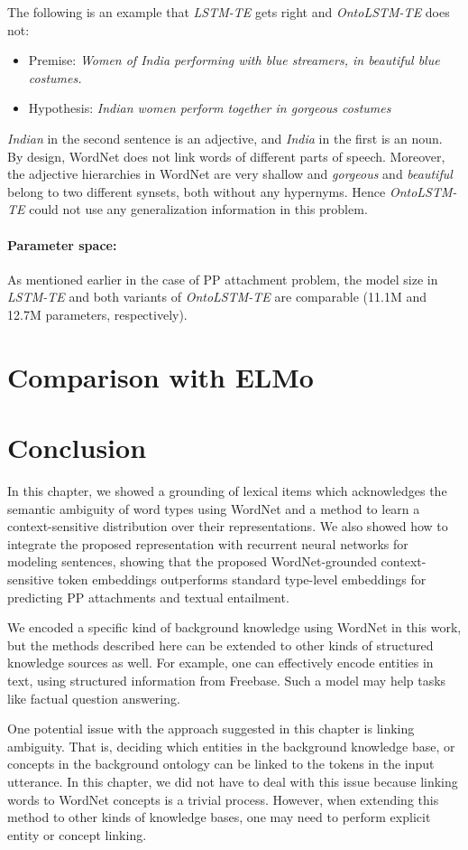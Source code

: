 The following is an example that \textit{LSTM-TE} gets right and \textit{OntoLSTM-TE} does not:
\begin{itemize}
 \item Premise: \textit{Women of India performing with blue streamers, in 
beautiful blue costumes.}
 \item Hypothesis: \textit{Indian women perform together in gorgeous costumes}
\end{itemize}
\textit{Indian} in the second sentence is an adjective, and \textit{India} in 
the first is an noun. By design, WordNet does not link words of different parts 
of speech. Moreover, the adjective hierarchies in WordNet are very shallow and 
\textit{gorgeous} and \textit{beautiful} belong to two different synsets, both 
without any hypernyms. Hence \textit{OntoLSTM-TE} could not use any generalization 
information in this problem.

\paragraph{Parameter space:} As mentioned earlier in the case of PP attachment problem,
the model size in \textit{LSTM-TE} and both variants of \textit{OntoLSTM-TE} are comparable
(11.1M and 12.7M parameters, respectively).

\section{Comparison with ELMo} \label{sec:ontolstm_vs_elmo}

\section{Conclusion}
In this chapter, we showed a grounding of lexical items which acknowledges the semantic ambiguity 
of word types using WordNet and a method to learn a context-sensitive distribution over their representations.
We also showed how to integrate the proposed representation with recurrent neural networks for modeling sentences,
showing that the proposed WordNet-grounded context-sensitive token embeddings outperforms standard type-level embeddings
for predicting PP attachments and textual entailment.

We encoded a specific kind of background knowledge using WordNet in this work, but the methods described here can be extended 
to other kinds of structured knowledge sources as well. For example, one can effectively encode entities in text, using structured information
from Freebase. Such a model may help tasks like factual question answering.

One potential issue with the approach suggested in this chapter is
linking ambiguity. That is, deciding which entities in the background knowledge base, or concepts in the background ontology can be linked to
the tokens in the input utterance. In this chapter, we did not have to deal with this issue because linking words to WordNet concepts is a
trivial process. However, when extending this method to other kinds of knowledge bases, one may need to perform explicit entity or concept linking.
